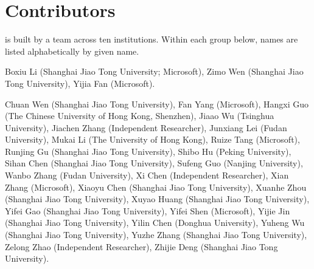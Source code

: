 \section*{Contributors}

\systemname is built by a team across ten institutions. Within each group below,
names are listed alphabetically by given name.

\vspace{0.4em}
\par
\vspace{0.15em}
\noindent
Boxiu Li (Shanghai Jiao Tong University; Microsoft),
Zimo Wen (Shanghai Jiao Tong University),
Yijia Fan (Microsoft).

\vspace{0.55em}
\par
\vspace{0.15em}
\noindent
Chuan Wen (Shanghai Jiao Tong University),
Fan Yang (Microsoft),
Hangxi Guo (The Chinese University of Hong Kong, Shenzhen),
Jiaao Wu (Tsinghua University),
Jiachen Zhang (Independent Researcher),
Junxiang Lei (Fudan University),
Mukai Li (The University of Hong Kong),
Ruize Tang (Microsoft),
Runjing Gu (Shanghai Jiao Tong University),
Shibo Hu (Peking University),
Sihan Chen (Shanghai Jiao Tong University),
Sufeng Guo (Nanjing University),
Wanbo Zhang (Fudan University),
Xi Chen (Independent Researcher),
Xian Zhang (Microsoft),
Xiaoyu Chen (Shanghai Jiao Tong University),
Xuanhe Zhou (Shanghai Jiao Tong University),
Xuyao Huang (Shanghai Jiao Tong University),
Yifei Gao (Shanghai Jiao Tong University),
Yifei Shen (Microsoft),
Yijie Jin (Shanghai Jiao Tong University),
Yilin Chen (Donghua University),
Yuheng Wu (Shanghai Jiao Tong University),
Yuzhe Zhang (Shanghai Jiao Tong University),
Zelong Zhao (Independent Researcher),
Zhijie Deng (Shanghai Jiao Tong University).
